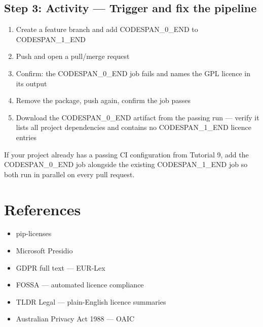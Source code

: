 \documentclass[11pt,a4paper]{book}
\begin{document}
\subsection{Step 3: Activity --- Trigger and fix the pipeline}

\begin{enumerate}
  \item Create a feature branch and add CODESPAN\_0\_END to CODESPAN\_1\_END
  \item Push and open a pull/merge request
  \item Confirm: the CODESPAN\_0\_END job fails and names the GPL licence in its output
  \item Remove the package, push again, confirm the job passes
  \item Download the CODESPAN\_0\_END artifact from the passing run --- verify it lists all project dependencies and contains no CODESPAN\_1\_END licence entries
\end{enumerate}

If your project already has a passing CI configuration from Tutorial 9, add the CODESPAN\_0\_END job alongside the existing CODESPAN\_1\_END job so both run in parallel on every pull request.

\medskip

\section{References}

\begin{itemize}
  \item pip-licenses
  \item Microsoft Presidio
  \item GDPR full text --- EUR-Lex
  \item FOSSA --- automated licence compliance
  \item TLDR Legal --- plain-English licence summaries
  \item Australian Privacy Act 1988 --- OAIC
\end{itemize}
\end{document}
